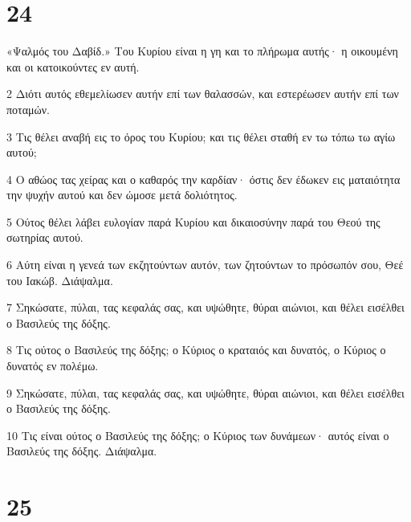 \chapter{24}

\par «Ψαλμός του Δαβίδ.» Του Κυρίου είναι η γη και το πλήρωμα αυτής· η οικουμένη και οι κατοικούντες εν αυτή.
\par 2 Διότι αυτός εθεμελίωσεν αυτήν επί των θαλασσών, και εστερέωσεν αυτήν επί των ποταμών.
\par 3 Τις θέλει αναβή εις το όρος του Κυρίου; και τις θέλει σταθή εν τω τόπω τω αγίω αυτού;
\par 4 Ο αθώος τας χείρας και ο καθαρός την καρδίαν· όστις δεν έδωκεν εις ματαιότητα την ψυχήν αυτού και δεν ώμοσε μετά δολιότητος.
\par 5 Ούτος θέλει λάβει ευλογίαν παρά Κυρίου και δικαιοσύνην παρά του Θεού της σωτηρίας αυτού.
\par 6 Αύτη είναι η γενεά των εκζητούντων αυτόν, των ζητούντων το πρόσωπόν σου, Θεέ του Ιακώβ. Διάψαλμα.
\par 7 Σηκώσατε, πύλαι, τας κεφαλάς σας, και υψώθητε, θύραι αιώνιοι, και θέλει εισέλθει ο Βασιλεύς της δόξης.
\par 8 Τις ούτος ο Βασιλεύς της δόξης; ο Κύριος ο κραταιός και δυνατός, ο Κύριος ο δυνατός εν πολέμω.
\par 9 Σηκώσατε, πύλαι, τας κεφαλάς σας, και υψώθητε, θύραι αιώνιοι, και θέλει εισέλθει ο Βασιλεύς της δόξης.
\par 10 Τις είναι ούτος ο Βασιλεύς της δόξης; ο Κύριος των δυνάμεων· αυτός είναι ο Βασιλεύς της δόξης. Διάψαλμα.

\chapter{25}

